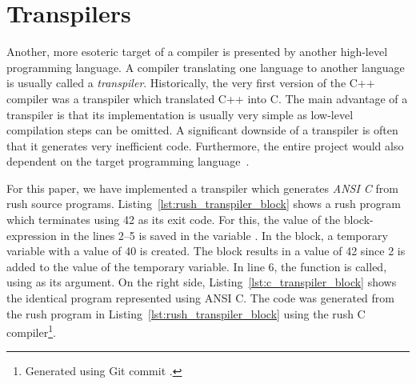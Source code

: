 \section{Transpilers}

Another, more esoteric target of a compiler is presented by another high-level programming language.
A compiler translating one language to another language is usually called a \emph{transpiler}.
Historically, the very first version of the C++ compiler was a transpiler which translated C++ into C.
The main advantage of a transpiler is that its implementation is usually very simple as low-level compilation steps can be omitted.
A significant downside of a transpiler is often that it generates very inefficient code.
Furthermore, the entire project would also dependent on the target programming language~\cite[p.~5]{Jeffery2021}.

For this paper, we have implemented a transpiler which generates \emph{ANSI C} from rush source programs.
Listing~\ref{lst:rush_transpiler_block} shows a rush program which terminates using 42 as its exit code.
For this, the value of the block-expression in the lines 2--5 is saved in the variable .
In the block, a temporary variable with a value of 40 is created.
The block results in a value of 42 since 2 is added to the value of the temporary variable.
In line 6, the  function is called, using  as its argument.
On the right side, Listing~\ref{lst:c_transpiler_block} shows the identical program represented using ANSI C.
The code was generated from the rush program in Listing~\ref{lst:rush_transpiler_block} using the rush C compiler\footnote{Generated using Git commit \rushCommit{}.}.

\begin{minipage}{.34\textwidth}
	\center
\end{minipage}%
\hspace{3cm}%
\begin{minipage}{.45\textwidth}
	\center
\end{minipage}

